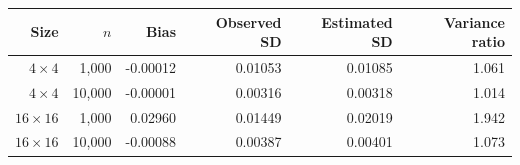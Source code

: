 \begin{tabular}{@{}rrrrrr@{}}\toprule
Size & \(n\) & Bias & Observed SD & Estimated SD & Variance ratio\\\midrule
\(4\times4\) & 1,000 & -0.00012 & 0.01053 & 0.01085 & 1.061\\
\(4\times4\) & 10,000 & -0.00001 & 0.00316 & 0.00318 & 1.014\\
\(16\times16\) & 1,000 & 0.02960 & 0.01449 & 0.02019 & 1.942\\
\(16\times16\) & 10,000 & -0.00088 & 0.00387 & 0.00401 & 1.073\\
\bottomrule
\end{tabular}
